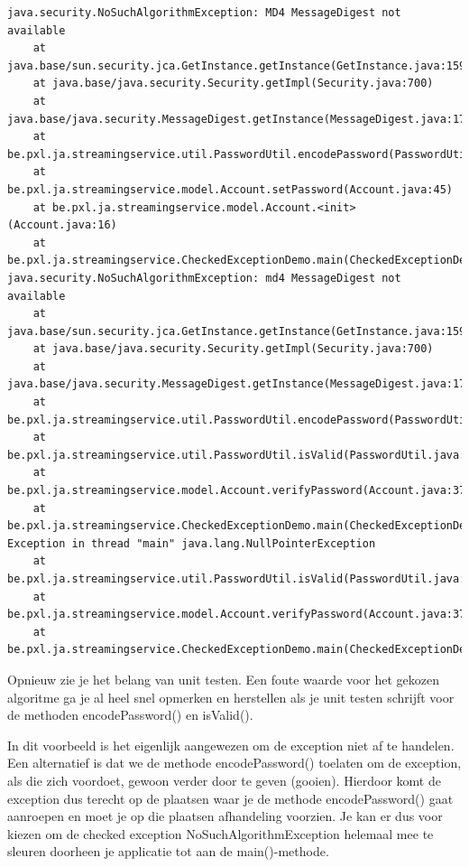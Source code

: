 \begin{verbatim}
java.security.NoSuchAlgorithmException: MD4 MessageDigest not available
	at java.base/sun.security.jca.GetInstance.getInstance(GetInstance.java:159)
	at java.base/java.security.Security.getImpl(Security.java:700)
	at java.base/java.security.MessageDigest.getInstance(MessageDigest.java:177)
	at be.pxl.ja.streamingservice.util.PasswordUtil.encodePassword(PasswordUtil.java:15)
	at be.pxl.ja.streamingservice.model.Account.setPassword(Account.java:45)
	at be.pxl.ja.streamingservice.model.Account.<init>(Account.java:16)
	at be.pxl.ja.streamingservice.CheckedExceptionDemo.main(CheckedExceptionDemo.java:8)
java.security.NoSuchAlgorithmException: md4 MessageDigest not available
	at java.base/sun.security.jca.GetInstance.getInstance(GetInstance.java:159)
	at java.base/java.security.Security.getImpl(Security.java:700)
	at java.base/java.security.MessageDigest.getInstance(MessageDigest.java:177)
	at be.pxl.ja.streamingservice.util.PasswordUtil.encodePassword(PasswordUtil.java:15)
	at be.pxl.ja.streamingservice.util.PasswordUtil.isValid(PasswordUtil.java:25)
	at be.pxl.ja.streamingservice.model.Account.verifyPassword(Account.java:37)
	at be.pxl.ja.streamingservice.CheckedExceptionDemo.main(CheckedExceptionDemo.java:9)
Exception in thread "main" java.lang.NullPointerException
	at be.pxl.ja.streamingservice.util.PasswordUtil.isValid(PasswordUtil.java:25)
	at be.pxl.ja.streamingservice.model.Account.verifyPassword(Account.java:37)
	at be.pxl.ja.streamingservice.CheckedExceptionDemo.main(CheckedExceptionDemo.java:9)
\end{verbatim}

Opnieuw zie je het belang van unit testen. Een foute waarde voor het gekozen algoritme ga je al heel snel opmerken en herstellen als je unit testen schrijft voor de methoden encodePassword() en isValid().

In dit voorbeeld is het eigenlijk aangewezen om de exception niet af te handelen. Een alternatief is dat we de methode encodePassword() toelaten om de exception, als die zich voordoet, gewoon verder door te geven (gooien).
Hierdoor komt de exception dus terecht op de plaatsen waar je de methode encodePassword() gaat aanroepen en moet je op die plaatsen afhandeling voorzien. Je kan er dus voor kiezen om de checked exception NoSuchAlgorithmException helemaal mee te sleuren doorheen je applicatie tot aan de main()-methode.

